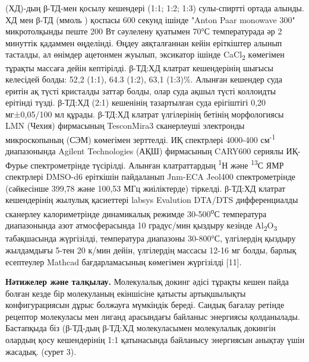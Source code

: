 \begin{multicols}{2}
(ХД)-дың β-ТД-мен қосылу кешендері (1:1; 1:2; 1:3) сулы-спиртті ортада
алынды. ХД мен β-ТД (ммоль ) қоспасы 600 секунд ішінде "Anton Paar
monowave 300" микротолқынды пеште 200 Вт сәулелену қуатымен 70°С
температурада әр 2 минуттік қадаммен өңделінді. Өңдеу аяқталғаннан кейін
еріткіштер алынып тасталды, ал өнімдер ацетонмен жуылып, эксикатор
ішінде CaCl\textsubscript{2} көмегімен тұрақты массаға дейін кептірілді.
β-ТД:ХД клатрат кешендерінің шығысы келесідей болды: 52,2 (1:1), 64.3
(1:2), 63,1 (1:3)\%. Алынған кешендер суда еритін ақ түсті кристалды
заттар болды, олар суда ақшыл түсті коллоидты ерітінді түзді. β-ТД:ХД
(2:1) кешенінің тазартылған суда ерігіштігі 0,20 мг±0,05/100 мл құрады.
β-ТД:ХД клатрат үлгілерінің бетінің морфологиясы LMN (Чехия) фирмасының
TesconMira3 сканерлеуші электронды микроскопының (СЭМ) көмегімен
зерттелді. ИҚ спектрлері 4000-400 см\textsuperscript{-1} диапазонында
Agilent Technologies (АҚШ) фирмасының CARY600 сериялы ИҚ-Фурье
спектрометрінде түсірілді. Алынған клатраттардың \textsuperscript{1}Н
және \textsuperscript{13}С ЯМР спектрлері DMSO-d6 еріткішін пайдаланып
Jnm-ECA Jeol400 спектрометрінде (сәйкесінше 399,78 және 100,53 МГц
жиіліктерде) тіркелді. β-ТД:ХД клатрат кешендерінің жылулық қасиеттері
labsys Evalution DTA/DTS дифференциалды сканерлеу калориметрінде
динамикалық режимде 30-500\textsuperscript{о}С температура диапазонында
азот атмосферасында 10 градус/мин қыздыру кезінде
Al\textsubscript{2}O\textsubscript{3} табақшасында жүргізілді,
температура диапазоны 30-800°С, үлгілердің қыздыру жылдамдығы 5-тен 20
к/мин дейін, үлгілердің массасы 12-16 мг болды, барлық есептеулер
Mathcad бағдарламасының көмегімен жүргізілді {[}11{]}.

{\bfseries Нәтижелер және талқылау.} Молекулалық докинг әдісі тұрақты кешен
пайда болған кезде бір молекуланың екіншісіне қатысты артықшылықты
конфигурациясын дұрыс болжауға мүмкіндік береді. Сандық бағалау ретінде
рецептор молекуласы мен лиганд арасындағы байланыс энергиясы
қолданылады. Бастапқыда біз (β-ТД-дың β-ТД:ХД молекуласымен молекулалық
докингін олардың қосу кешендерінің 1:1 қатынасында байланысу энергиясын
анықтау үшін жасадық. (сурет 3).
\end{multicols}

